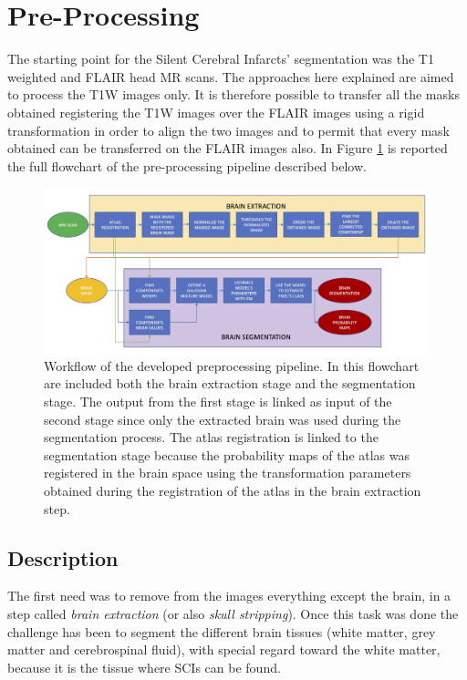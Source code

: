 \documentclass{standalone}
\begin{document}
\section{Pre-Processing}

The starting point for the Silent Cerebral Infarcts' segmentation was the T1 weighted and FLAIR head MR scans. 
The approaches here explained are aimed to process the T1W images only. It is therefore possible to transfer all the masks obtained registering the T1W images over the FLAIR images using a rigid transformation in order to align the two images and to permit that every mask obtained can be transferred on the FLAIR images also.
In Figure \ref{fig:flowchart_pre} is reported the full flowchart of the pre-processing pipeline described below.

\begin{figure}[h!]
    \centering
    \includegraphics[scale = 0.155]{img/Chap2/FLOWCHART_PRE.jpg}
    \caption{Workflow of the developed preprocessing pipeline. In this flowchart are included both the brain extraction stage and the segmentation stage. The output from the first stage is linked as input of the second stage since only the extracted brain was used during the segmentation process. The atlas registration is linked to the segmentation stage because the probability maps of the atlas was registered in the brain space using the transformation parameters obtained during the registration of the atlas in the brain extraction step.}
    \label{fig:flowchart_pre}
\end{figure}

\subsection{Description}

The first need was to remove from the images everything except the brain, in a step called \textit{brain extraction} (or also \textit{skull stripping}). 
Once this task was done the challenge has been to segment the different brain tissues (white matter, grey matter and cerebrospinal fluid), with special regard toward the white matter, because it is the tissue where SCIs can be found.
\end{document}
